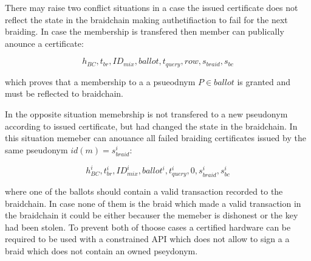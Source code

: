 \documentclass[12pt]{article}
\begin{document}
There may raise two conflict situations in a case the issued certificate does not reflect the state in the braidchain making authetifiaction to fail for the next braiding. In case the membership is transfered then member can publically anounce a certificate:

\begin{equation}
 h_{BC}, t_{br}, ID_{mix}, ballot, t_{query}, row, s_{braid}, s_{bc} 
\end{equation}

which proves that a membership to a a psueodnym $P \in ballot$ is granted and must be reflected to braidchain. 

In the opposite situation memebrship is not transfered to a new pseudonym according to issued certificate, but had changed the state in the braidchain. In this situation memeber can anouance all failed braiding certificates issued by the same pseudonym $id(m)=s^i_{braid}$:

\begin{equation}
 h^i_{BC}, t^i_{br}, ID^i_{mix}, ballot^i, t^i_{query}, 0, s^i_{braid}, s^i_{bc}
\end{equation}

where one of the ballots should contain a valid transaction recorded to the braidchain. In case none of them is the braid which made a valid transaction in the braidchain it could be either becauser the memeber is dishonest or the key had been stolen. To prevent both of thoose cases a certified hardware can be required to be used with a constrained API which does not allow to sign a a braid which does not contain an owned pseydonym.
\end{document}
